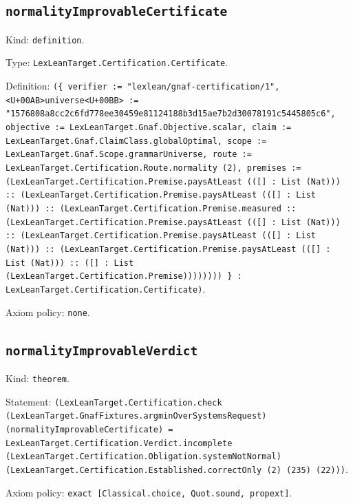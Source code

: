 \documentclass[11pt]{article}
\begin{document}
\subsection*{\texttt{normalityImprovableCertificate}}
\noindent Kind: \texttt{definition}.\par
\noindent Type: \texttt{LexLeanTarget.Certification.Certificate}.\par
\noindent Definition: \texttt{(\{ verifier := "lexlean/gnaf-certification/1", <U+00AB>universe<U+00BB> := "1576808a8cc2c6fd778ee30459e81124188b3d15ae7b2d30078191c5445805c6", objective := LexLeanTarget.Gnaf.Objective.scalar, claim := LexLeanTarget.Gnaf.ClaimClass.globalOptimal, scope := LexLeanTarget.Gnaf.Scope.grammarUniverse, route := LexLeanTarget.Certification.Route.normality (2), premises := (LexLeanTarget.Certification.Premise.paysAtLeast (([] : List (Nat))) :: (LexLeanTarget.Certification.Premise.paysAtLeast (([] : List (Nat))) :: (LexLeanTarget.Certification.Premise.measured :: (LexLeanTarget.Certification.Premise.paysAtLeast (([] : List (Nat))) :: (LexLeanTarget.Certification.Premise.paysAtLeast (([] : List (Nat))) :: (LexLeanTarget.Certification.Premise.paysAtLeast (([] : List (Nat))) :: ([] : List (LexLeanTarget.Certification.Premise)))))))) \} : LexLeanTarget.Certification.Certificate)}.\par
\noindent Axiom policy: \texttt{none}.\par
\subsection*{\texttt{normalityImprovableVerdict}}
\noindent Kind: \texttt{theorem}.\par
\noindent Statement: \texttt{(LexLeanTarget.Certification.check (LexLeanTarget.GnafFixtures.argminOverSystemsRequest) (normalityImprovableCertificate) = LexLeanTarget.Certification.Verdict.incomplete (LexLeanTarget.Certification.Obligation.systemNotNormal) (LexLeanTarget.Certification.Established.correctOnly (2) (235) (22)))}.\par
\noindent Axiom policy: \texttt{exact [Classical.choice, Quot.sound, propext]}.\par
\end{document}
